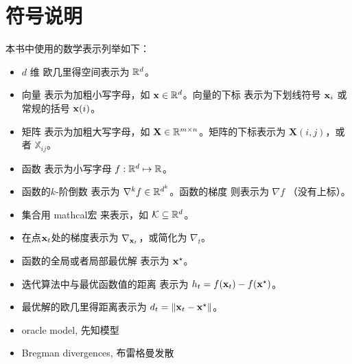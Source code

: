 \chapter*{
    符号说明
    }

本书中使用的数学表示列举如下：
\begin{itemize}
\item
$d$ 维 欧几里得空间表示为 ${\mathbb R}^d$。
\item
向量 表示为加粗小写字母，如 $\mathbf x \in {\mathbb R}^d$。向量的下标 表示为下划线符号 $\mathbf x_i$ 或常规的括号 $\mathbf x(i)$。
\item
矩阵 表示为加粗大写字母，如 $\mathbf{X}  \in {\mathbb R}^{m \times n}$。矩阵的下标表示为 $\mathbf{X}(i,j)$，或者 $\mathbb{X}_{ij}$。
\item
函数 表示为小写字母 $f: {\mathbb R}^d \mapsto {\mathbb R}$。
\item 
函数的$k$-阶倒数 表示为 $\nabla^k f \in {\mathbb R}^{d^k}$。函数的梯度 则表示为 $\nabla f$ （没有上标）。
\item
集合用 mathcal宏 来表示，如 $\mathcal K \subseteq {\mathbb R}^d$。
\item
在点$\mathbf x_t$处的梯度表示为 $\nabla_{\mathbf x_t}$，或简化为 $\nabla_t$。
\item
函数的全局或者局部最优解 表示为 $\mathbf x^\star$。
\item
迭代算法中与最优函数值的距离 表示为 $h_t = f(\mathbf x_t) - f(\mathbf x^\star)$。
\item
最优解的欧几里得距离表示为 $d_t = \|\mathbf x_t - \mathbf x^\star\| $。
\item 
oracle model, 先知模型
\item
Bregman divergences, 布雷格曼发散
\end{itemize}
